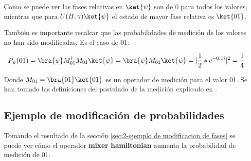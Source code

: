 Como se puede ver las fases relativas  %
en $\ket{\psi}$ son de 0 para todos los valores, mientras que para $U(H, \gamma) \ket{\psi}$ el estado de mayor fase relativa es $\ket{01}$.

También es importante recalcar que las probabilidades de medición de los valores no han sido modificadas. Es el caso de 01:

\begin{align*}
  P_{\psi}(01) = \bra{\psi}M_{01}^\dagger M_{01}\ket{\psi} = \bra{\psi}M_{01}\ket{\psi} = |\frac{1}{2}*e^{-0.1i}|^2 = \frac{1}{4}
\end{align*}

Donde $M_{01} = \bra{01}\ket{01}$ es un operador de medición para el valor 01.
Se han tomado las definiciones del postulado de la medición explicado en \cite{Nielsen_Chuang_2010}.


\subsection{Ejemplo de modificación de probabilidades}
Tomando el resultado de la sección \ref{sec:2-ejemplo de modificacion de fases} se puede ver cómo el operador \textbf{mixer hamiltonian} aumenta la probabilidad de medición de 01.

